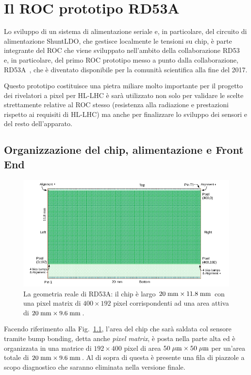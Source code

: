 \chapter{Il ROC prototipo RD53A}
\label{cap:RD53A}

Lo sviluppo di un sistema di alimentazione seriale e, in particolare, del circuito di alimentazione ShuntLDO, che gestisce localmente le tensioni su chip, è parte integrante del ROC che viene sviluppato nell'ambito della collaborazione RD53~\cite{RD53} e, in particolare, del primo ROC prototipo messo a punto dalla collaborazione, RD53A~\cite{RD53A}, che \`e diventato disponibile per la comunit\`a scientifica alla fine del 2017.

Questo prototipo costituisce una pietra miliare molto importante per il progetto dei rivelatori a pixel per HL-LHC \`e sar\`a utilizzato non solo per validare le scelte strettamente relative al ROC stesso (resistenza alla radiazione e prestazioni rispetto ai requisiti di HL-LHC) ma anche per finalizzare lo sviluppo dei sensori e del resto dell'apparato.

\section{Organizzazione del chip, alimentazione e Front End}
\label{Organizzazionechip}


\begin{figure}
\centering
\includegraphics[scale=.4]{Immagini/RD53ALayout}
\caption{La geometria reale di RD53A: il chip è largo $20\rm \; mm \times 11.8\rm \; mm$ con una pixel matrix di $400\times 192$ pixel corrispondenti ad una area attiva di $20\rm \; mm \times 9.6\rm \; mm$.}
\label{RD53ALayout}
\end{figure}
Facendo riferimento alla Fig.~\ref{RD53ALayout}, l'area del chip che sarà saldata col sensore tramite bump bonding, detta anche {\em pixel matrix}, è posta nella parte alta ed è organizzata in una matrice di $192\times400$ pixel di area $50\; \mu \rm m \times 50 \; \mu \rm m$ per un'area totale di $20\rm \; mm \times 9.6\rm \; mm$.
Al di sopra di questa è presente una fila di piazzole a scopo diagnostico che saranno eliminata nella versione finale.

